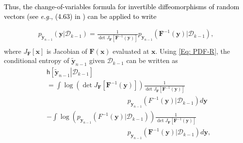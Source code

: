 \documentclass[10pt,twocolumn,twoside]{IEEEtran}
\begin{document}
\begin{IEEEproof}
\textcolor{black}{Thus, the change-of-variables formula for invertible diffeomorphisms of random vectors (see {\em e.g.}, (4.63) in \cite{leon-garcia}) can be applied to write}

	\begin{eqnarray}\label{Eq: PDF-R}
	p_{{\ensuremath{\boldsymbol{{\tilde{y}}}}}_{n-1}}\!\!{\left({{\ensuremath{\boldsymbol{{y}}}}\left|\mathcal{D}_{k-1}\right.}\right)}=\frac{1}{\det J_{{\ensuremath{\boldsymbol{{F}}}}}\!\!\left[{\ensuremath{\boldsymbol{{F}}}}^{-1}\!\!{\left({{\ensuremath{\boldsymbol{{y}}}}}\right)}\right]}p_{{\ensuremath{\boldsymbol{{y}}}}_{n-1}}\!\!{\left({{\ensuremath{\boldsymbol{{F}}}}^{-1}{\left({{\ensuremath{\boldsymbol{{y}}}}}\right)}\left|\mathcal{D}_{k-1}\right.}\right)},\nonumber\\
	
	\end{eqnarray}
	where $J_{{\ensuremath{\boldsymbol{{F}}}}}\left[{\ensuremath{\boldsymbol{{x}}}}\right]$ is Jacobian of  ${\ensuremath{\boldsymbol{{F}}}}{\left({{\ensuremath{\boldsymbol{{x}}}}}\right)}$ evaluated at ${\ensuremath{\boldsymbol{{x}}}}$. Using \eqref{Eq: PDF-R}, the conditional entropy of ${\ensuremath{\boldsymbol{{\tilde{y}}}}}_{n-1}$ given $\mathcal{D}_{k-1}$ can be written as
\begin{align}
&{\ensuremath{\mathsf{h}\left[\left.{{\ensuremath{\boldsymbol{{\tilde{y}}}}}_{n-1}}\right|{\mathcal{D}_{k-1}}\right]}}\nonumber\\
&=\int{\ensuremath{\log{\left({{\det J_{{\ensuremath{\boldsymbol{{F}}}}}\left[{\ensuremath{\boldsymbol{{F}}}}^{-1}{\left({{\ensuremath{\boldsymbol{{y}}}}}\right)}\right]}}\right)}}}\frac{1}{\det J_{{\ensuremath{\boldsymbol{{F}}}}}\left[{\ensuremath{\boldsymbol{{F}}}}^{-1}{\left({{\ensuremath{\boldsymbol{{y}}}}}\right)}\right]}\nonumber\\
&\hspace{5cm}p_{{\ensuremath{\boldsymbol{{y}}}}_{n-1}}{\left({F^{-1}{\left({{\ensuremath{\boldsymbol{{y}}}}}\right)}\left|\mathcal{D}_{k-1}\right.}\right)}d{\ensuremath{\boldsymbol{{y}}}}\nonumber\\
&-\int{\ensuremath{\log{\left({{p_{{\ensuremath{\boldsymbol{{y}}}}_{n-1}}{\left({F^{-1}{\left({{\ensuremath{\boldsymbol{{y}}}}}\right)}\left|\mathcal{D}_{k-1}\right.}\right)}}}\right)}}}\frac{1}{\det J_{{\ensuremath{\boldsymbol{{F}}}}}\left[{\ensuremath{\boldsymbol{{F}}}}^{-1}{\left({{\ensuremath{\boldsymbol{{y}}}}}\right)}\right]}\nonumber\\
&\hspace{5cm}p_{{\ensuremath{\boldsymbol{{y}}}}_{n-1}}{\left({{\ensuremath{\boldsymbol{{F}}}}^{-1}{\left({{\ensuremath{\boldsymbol{{y}}}}}\right)}\left|\mathcal{D}_{k-1}\right.}\right)}d{\ensuremath{\boldsymbol{{y}}}},\nonumber\\

\end{align}
\end{IEEEproof}
\end{document}
